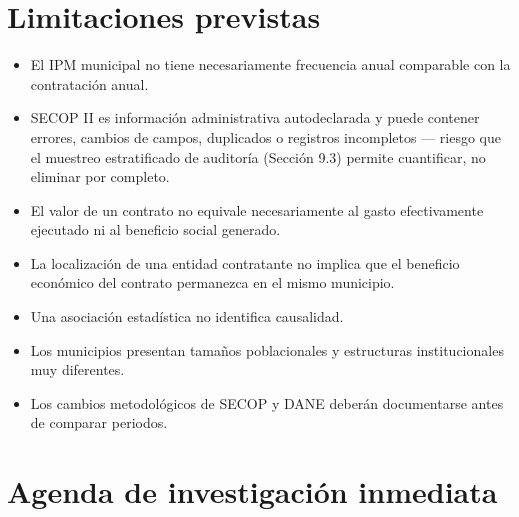 \documentclass[11pt,letterpaper]{article}
\begin{document}
\section{Limitaciones previstas}

\begin{itemize}
\item El IPM municipal no tiene necesariamente frecuencia anual comparable con
la contratación anual.
\item SECOP II es información administrativa autodeclarada y puede contener
errores, cambios de campos, duplicados o registros incompletos --- riesgo que
el muestreo estratificado de auditoría (Sección 9.3) permite cuantificar, no
eliminar por completo.
\item El valor de un contrato no equivale necesariamente al gasto
efectivamente ejecutado ni al beneficio social generado.
\item La localización de una entidad contratante no implica que el beneficio
económico del contrato permanezca en el mismo municipio.
\item Una asociación estadística no identifica causalidad.
\item Los municipios presentan tamaños poblacionales y estructuras
institucionales muy diferentes.
\item Los cambios metodológicos de SECOP y DANE deberán documentarse antes de
comparar periodos.
\end{itemize}

\section{Agenda de investigación inmediata}
\end{document}
